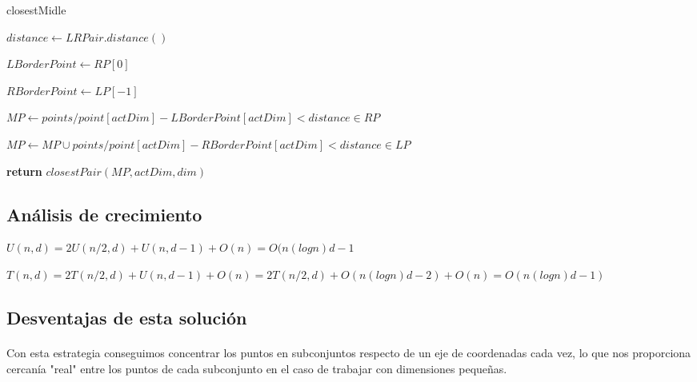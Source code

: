 \documentclass{article}
\begin{document}
		
		\begin{algorithm}[H]

			\caption{closestMidle}

			\label{closestMidle}

			\begin{algorithmic}[1] %

			
				\State $distance \gets LRPair.distance()$

				\State $LBorderPoint \gets RP[0]$

				\State $RBorderPoint \gets LP[-1]$

				\State
				
				\State $MP \gets points/  point[actDim]-LBorderPoint[actDim] < distance \in RP$

				\State $MP \gets MP \cup points/  point[actDim]-RBorderPoint[actDim] < distance \in LP$

				\State	
								
				\State \textbf{return} $closestPair(MP, actDim, dim)$


			\EndProcedure

			\end{algorithmic}

		\end{algorithm}

	\subsection{Análisis de crecimiento}
	
	$U (n, d) = 2U (n/2, d) + U (n, d - 1) + O(n) = O(n(log n)d -1 $
	
	$T(n,d) = 2T(n/2,d) + U(n,d - 1) + O(n) = 2T (n/2, d) + O(n(log n)d-2) + O(n) = O(n(log n)d -1)$

	\subsection{Desventajas de esta solución}

		\paragraph{}
		Con esta estrategia conseguimos concentrar los puntos en subconjuntos respecto de un eje de coordenadas cada vez, lo que nos proporciona cercanía "real" entre los puntos de cada subconjunto en el caso de trabajar con dimensiones pequeñas.
		
\end{document}
